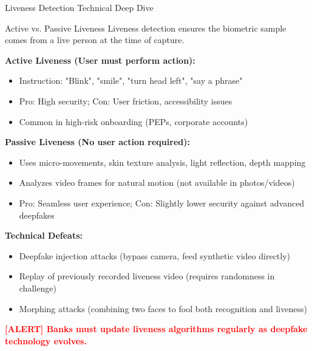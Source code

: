 \documentclass[11pt,a4paper]{beamer}
\newcommand{\redflag}[1]{\textcolor{red}{\textbf{[ALERT] #1}}}
\begin{document}
\begin{frame}{Liveness Detection Technical Deep Dive}
	\begin{block}{Active vs. Passive Liveness}
		Liveness detection ensures the biometric sample comes from a live person at the time of capture.
	\end{block}
	\textbf{Active Liveness (User must perform action):}
	\begin{itemize}
		\item Instruction: "Blink", "smile", "turn head left", "say a phrase"
		\item Pro: High security; Con: User friction, accessibility issues
		\item Common in high-risk onboarding (PEPs, corporate accounts)
	\end{itemize}
	\textbf{Passive Liveness (No user action required):}
	\begin{itemize}
		\item Uses micro-movements, skin texture analysis, light reflection, depth mapping
		\item Analyzes video frames for natural motion (not available in photos/videos)
		\item Pro: Seamless user experience; Con: Slightly lower security against advanced deepfakes
	\end{itemize}
	\textbf{Technical Defeats:}
	\begin{itemize}
		\item Deepfake injection attacks (bypass camera, feed synthetic video directly)
		\item Replay of previously recorded liveness video (requires randomness in challenge)
		\item Morphing attacks (combining two faces to fool both recognition and liveness)
	\end{itemize}
	\redflag{Banks must update liveness algorithms regularly as deepfake technology evolves.}
\end{frame}
\end{document}
